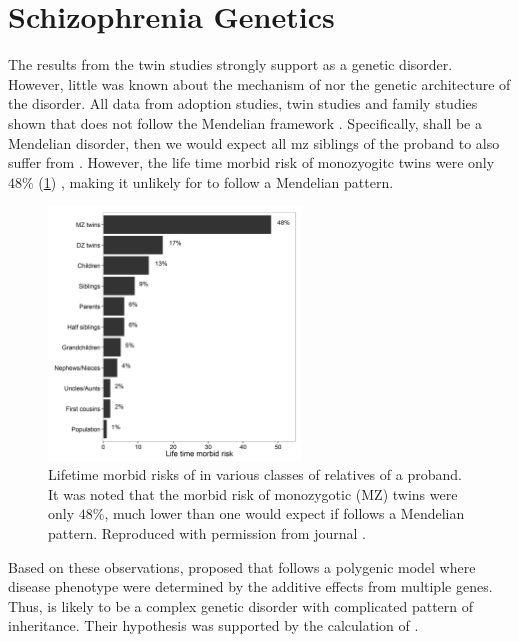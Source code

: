 	\section{Schizophrenia Genetics}
	The results from the twin studies strongly support  as a genetic disorder.
	However, little was known about the mechanism of  nor the genetic architecture of the disorder. 
	All data from adoption studies, twin studies and family studies shown that  does not follow the Mendelian framework \citep{Gottesman01071967,Gottesman1982}.
	Specifically, shall  be a Mendelian disorder, then we would expect all \gls{mz} siblings of the proband to also suffer from .
	However, the life time morbid risk of monozyogitc twins were only $48\%$ (\cref{fig:lifeMRscz}) \citep{gottesman1991schizophrenia}, making it unlikely for  to follow a Mendelian pattern.
	\begin{figure}[t]
		\centering
		\includegraphics[width=0.6\textwidth]{figure/lifeTimeMorbidRisk.png}
		\caption[Lifetime morbid risks of  in various classes of relatives of a proband]{Lifetime morbid risks of  in various classes of relatives of a proband.
			It was noted that the morbid risk of monozygotic (MZ) twins were only $48\%$, much lower than one would expect if  follows a Mendelian pattern.
			Reproduced with permission from journal \citep{Riley2006}. \label{fig:lifeMRscz}}
	\end{figure}
	
	
	Based on these observations, \citet{Gottesman1967} proposed that  follows a polygenic model where disease phenotype were determined by the additive effects from multiple genes.
	Thus,  is likely to be a complex genetic disorder with complicated pattern of inheritance. 
	Their hypothesis was supported by the calculation of \citet{Risch1990a}.
	

